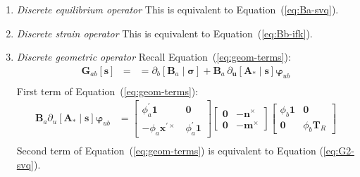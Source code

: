 \begin{enumerate}
\def\labelenumi{\arabic{enumi}.}

\item \emph{Discrete equilibrium operator} This is equivalent to Equation~(\ref{eq:Ba-svq}).
%
\item \emph{Discrete strain operator} This is equivalent to Equation~(\ref{eq:Bb-ifk}).
%
\item \emph{Discrete geometric operator}
Recall Equation~(\ref{eq:geom-terms}):
\begin{equation*} 
\begin{aligned}
\bm{G}_{ab}[\bm{s}] &= 
&= \partial_b[\bm{B}_a\mid\bm{\sigma}] + \bm{B}_a \, \partial_{\bm{u}} [\bm{A}_*\mid\bm{s}] \bm{\varphi}_{u b} \\
\end{aligned}
\end{equation*}
%
First term of Equation~(\ref{eq:geom-terms}): %
\begin{equation*} 
     \begin{aligned}
     \bm{B}_a\partial_u [\bm{A}_*\mid\bm{s}]\bm{\varphi}_{u b}
     &= \begin{bmatrix}
      \phi_a^\prime\mathbf{1} & \mathbf{0} \\
      -\phi_a \bm{x}^{\prime\times} \, & \phi_a^{\prime} \mathbf{1}
      \end{bmatrix} \begin{bmatrix}
       \mathbf{0} & -\bm{n}^{\times} \\
       \mathbf{0} & -\bm{m}^{\times}
      \end{bmatrix}  \begin{bmatrix}
      \phi_b \mathbf{1} & \mathbf{0} \\
      \mathbf{0} & \phi_b \mathbf{T}_{\scriptscriptstyle{R}}
      \end{bmatrix} \\
     \end{aligned}
     \end{equation*}
%
Second term of Equation~(\ref{eq:geom-terms}) is equivalent to Equation (\ref{eq:G2-svq}).
\end{enumerate}
